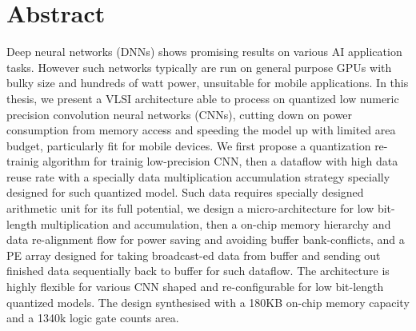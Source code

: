 \chapter{Abstract}
\label{ch:abstract}
Deep neural networks (DNNs) shows promising results on various AI application tasks. However such networks typically are run on general purpose GPUs with bulky size and hundreds of watt power, unsuitable for mobile applications. In this thesis, we present a VLSI architecture able to process on quantized low numeric precision convolution neural networks (CNNs), cutting down on power consumption from memory access and speeding the model up with limited area budget, particularly fit for mobile devices. We first propose a quantization re-trainig algorithm for trainig low-precision CNN, then a dataflow with high data reuse rate with a specially data multiplication accumulation strategy specially designed for such quantized model. Such data requires specially designed arithmetic unit for its full potential, we design a micro-architecture for low bit-length multiplication and accumulation, then a on-chip memory hierarchy and data re-alignment flow for power saving and avoiding buffer bank-conflicts, and a PE array designed for taking broadcast-ed data from buffer and sending out finished data sequentially back to buffer for such dataflow. The architecture is highly flexible for various CNN shaped and re-configurable for low bit-length quantized models. The design synthesised with a 180KB on-chip memory capacity and a 1340k logic gate counts area.